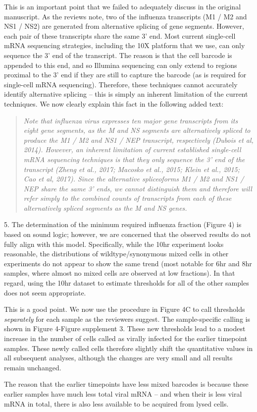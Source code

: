 \documentclass[11pt, oneside]{article}   	%
\begin{document}
{\color{black}
This is an important point that we failed to adequately discuss in the original manuscript.
As the reviews note, two of the influenza transcripts (M1 / M2  and NS1 / NS2) are generated from alternative splicing of gene segments.
However, each pair of these transcripts share the same 3' end.
Most current single-cell mRNA sequencing strategies, including the 10X platform that we use, can only sequence the 3' end of the transcript.
The reason is that the cell barcode is appended to this end, and so Illumina sequencing can only extend to regions proximal to the 3' end if they are still to capture the barcode (as is required for single-cell mRNA sequencing).
Therefore, these techniques cannot accurately identify alternative splicing -- this is simply an inherent limitation of the current techniques.
We now clearly explain this fact in the following added text:
\begin{quote}
\textsl{
Note that influenza virus expresses ten major gene transcripts from its eight gene segments, as the M and NS segments are alternatively spliced to produce the M1 / M2 and NS1 / NEP transcript, respectively (Dubois et al, 2014).
However, an inherent limitation of current established single-cell mRNA sequencing techniques is that they only sequence the 3' end of the transcript (Zheng et al., 2017; Macosko et al., 2015; Klein et al., 2015; Cao et al, 2017).
Since the alternative spliceoforms M1 / M2 and NS1 / NEP share the same 3' ends, we cannot distinguish them and therefore will refer simply to the combined counts of transcripts from each of these alternatively spliced segments as the M and NS genes.}
\end{quote}
}

5. The determination of the minimum required influenza fraction (Figure 4) is based on sound logic; however, we are concerned that the observed results do not fully align with this model. Specifically, while the 10hr experiment looks reasonable, the distributions of wildtype/synonymous mixed cells in other experiments do not appear to show the same trend (most notable for 6hr and 8hr samples, where almost no mixed cells are observed at low fractions). In that regard, using the 10hr dataset to estimate thresholds for all of the other samples does not seem appropriate. 

{\color{black}
This is a good point. 
We now use the procedure in Figure 4C to call thresholds \emph{separately} for each sample as the reviewers suggest.
The sample-specific calling is shown in Figure 4-Figure supplement 3.
These new thresholds lead to a modest increase in the number of cells called as virally infected for the earlier timepoint samples.
These newly called cells therefore slightly shift the quantitative values in all subsequent analyses, although the changes are very small and all results remain unchanged.

The reason that the earlier timepoints have less mixed barcodes is because these earlier samples have much less total viral mRNA -- and when their is less viral mRNA in total, there is also less available to be acquired from lysed cells.
}
\end{document}
